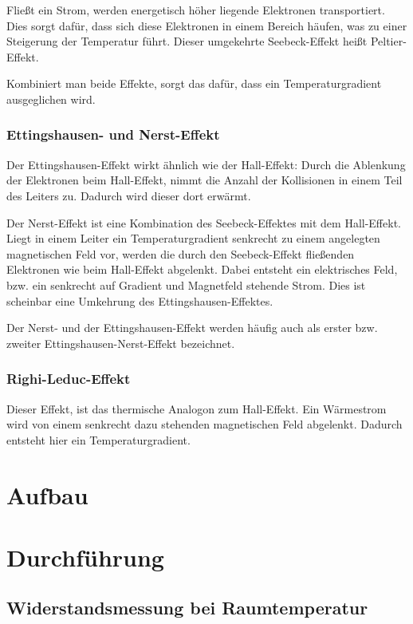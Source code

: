 Fließt ein Strom, werden energetisch höher liegende Elektronen transportiert.
Dies sorgt dafür, dass sich diese Elektronen in einem Bereich häufen, was zu
einer Steigerung der Temperatur führt. Dieser umgekehrte Seebeck-Effekt heißt
Peltier-Effekt.

Kombiniert man beide Effekte, sorgt das dafür, dass ein Temperaturgradient
ausgeglichen wird.

\subsection{Ettingshausen- und Nerst-Effekt}

Der Ettingshausen-Effekt wirkt ähnlich wie der Hall-Effekt: Durch die
Ablenkung der Elektronen beim Hall-Effekt, nimmt die Anzahl der Kollisionen in
einem Teil des Leiters zu. Dadurch wird dieser dort erwärmt.

Der Nerst-Effekt ist eine Kombination des Seebeck-Effektes mit dem Hall-Effekt.
Liegt in einem Leiter ein Temperaturgradient senkrecht zu einem angelegten
magnetischen Feld vor, werden die durch den Seebeck-Effekt fließenden
Elektronen wie beim Hall-Effekt abgelenkt. Dabei entsteht ein elektrisches
Feld, bzw. ein senkrecht auf Gradient und Magnetfeld stehende Strom. Dies ist
scheinbar eine Umkehrung des Ettingshausen-Effektes.

Der Nerst- und der Ettingshausen-Effekt werden häufig auch als erster bzw.
zweiter Ettingshausen-Nerst-Effekt bezeichnet.

\subsection{Righi-Leduc-Effekt}

Dieser Effekt, ist das thermische Analogon zum Hall-Effekt. Ein Wärmestrom wird
von einem senkrecht dazu stehenden magnetischen Feld abgelenkt. Dadurch
entsteht hier ein Temperaturgradient.

\FloatBarrier
\chapter{Aufbau}

\FloatBarrier
\chapter{Durchführung}

\section{Widerstandsmessung bei Raumtemperatur}

